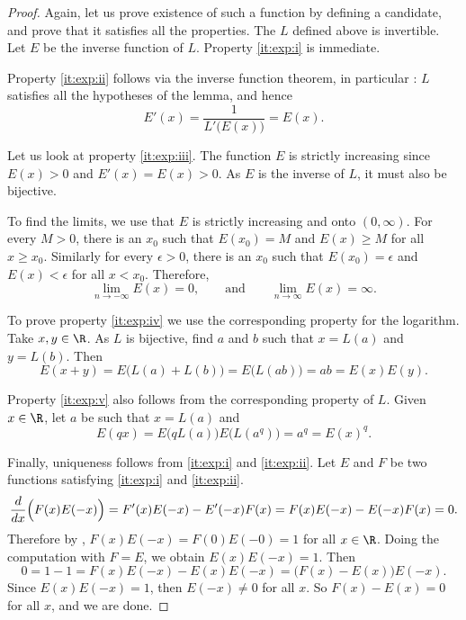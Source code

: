 \documentclass[12pt]{book}
\begin{document}
\begin{proof}
Again, let us prove existence of such a function by defining a candidate,
and prove that it satisfies all the properties.
The $L$ defined above is invertible.
Let $E$ be the
inverse function of $L$.
Property \ref{it:exp:i} is immediate.

Property \ref{it:exp:ii} follows
via the inverse function theorem, in particular
:  $L$ satisfies
all the hypotheses of the lemma, and hence
\begin{equation*}
E'(x) = \frac{1}{L'\bigl(E(x)\bigr)} = E(x) .
\end{equation*}

Let us look at property \ref{it:exp:iii}.
The function $E$ is strictly increasing since $E(x) > 0$ and
$E'(x) = E(x) > 0$.
As $E$ is the inverse of $L$, it must also
be bijective.

To find the limits, we use that 
$E$ is strictly increasing and onto $(0,\infty)$.
For every $M > 0$, there is an $x_0$ such that
$E(x_0) = M$ and $E(x) \geq M$ for all $x \geq x_0$.
Similarly for every $\epsilon > 0$, there is
an $x_0$ such that $E(x_0) = \epsilon$ and
$E(x) < \epsilon$ for all $x < x_0$.
Therefore,
\begin{equation*}
\lim_{n\to -\infty} E(x) = 0 , \qquad \text{and} \qquad
\lim_{n\to \infty} E(x) = \infty .
\end{equation*}

To prove property \ref{it:exp:iv} we use the corresponding
property for the logarithm.
Take $x, y \in \R$.
As $L$ is bijective, find $a$ and $b$ such that $x = L(a)$ and $y = L(b)$.
Then
\begin{equation*}
E(x+y) =
E\bigl(L(a)+L(b)\bigr) = 
E\bigl(L(ab)\bigr) = ab = E(x)E(y)  .
\end{equation*}

Property \ref{it:exp:v} also follows from the corresponding property of $L$.
Given $x \in \R$, let $a$ be such that $x = L(a)$ and
\begin{equation*}
E(qx) = E\bigl(qL(a)\bigr)
E\bigl(L(a^q)\bigr) = a^q = {E(x)}^q .
\end{equation*}

Finally, uniqueness follows from
\ref{it:exp:i} and
\ref{it:exp:ii}.
Let $E$ and $F$
be two functions satisfying
\ref{it:exp:i} and \ref{it:exp:ii}.  
\begin{equation*}
\frac{d}{dx} \Bigl( F(x)E(-x) \Bigr)
=
F'(x)E(-x) - E'(-x)F(x)
=
F(x)E(-x) - E(-x)F(x) = 0 .
\end{equation*}
Therefore by ,
$F(x)E(-x) = F(0)E(-0) = 1$ for all $x \in \R$.
Doing the computation with $F = E$,
we obtain $E(x)E(-x) = 1$.
Then
\begin{equation*}
0 = 1-1 = F(x)E(-x) - E(x)E(-x) = \bigl(F(x)-E(x)\bigr) E(-x) .
\end{equation*}
Since $E(x)E(-x) = 1$, then $E(-x) \not= 0$ for
all $x$.
So
$F(x)-E(x) = 0$ for all $x$, and we are done.
\end{proof}
\end{document}

